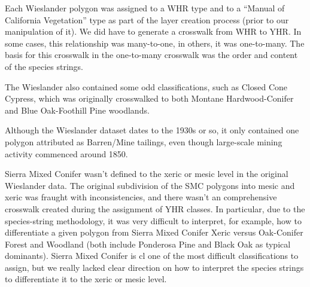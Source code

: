 Each Wieslander polygon was assigned to a WHR type and to a ``Manual of California Vegetation'' type as part of the layer creation process (prior to our manipulation of it). We did have to generate a crosswalk from WHR to YHR. In some cases, this relationship was many-to-one, in others, it was one-to-many. The basis for this crosswalk in the one-to-many crosswalk was the order and content of the species strings. 

The Wieslander also contained some odd classifications, such as Closed Cone Cypress, which was originally crosswalked to both Montane Hardwood-Conifer and Blue Oak-Foothill Pine woodlands.

Although the Wieslander dataset dates to the 1930s or so, it only contained one polygon attributed as Barren/Mine tailings, even though large-scale mining activity commenced around 1850.

Sierra Mixed Conifer wasn't defined to the xeric or mesic level in the original Wieslander data. The original subdivision of the SMC polygons into mesic and xeric was fraught with inconsistencies, and there wasn't an comprehensive crosswalk created during the assignment of YHR classes. In particular, due to the species-string methodology, it was very difficult to interpret, for example, how to differentiate a given polygon from Sierra Mixed Conifer Xeric versus Oak-Conifer Forest and Woodland (both include Ponderosa Pine and Black Oak as typical dominants). Sierra Mixed Conifer is cl
 one of the most difficult classifications to assign, but we really lacked clear direction on how to interpret the species strings to differentiate it to the xeric or mesic level.

